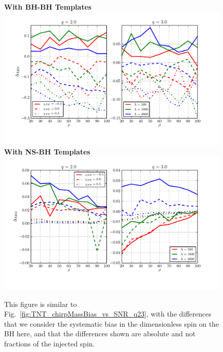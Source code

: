 \documentclass[aps,prd,amsmath,floats,floatfix, twocolumn,
superscriptaddress,nofootinbib,showpacs]{revtex4-1}
\begin{document}
\begin{figure}[h]
\centering    
\textbf{With BH-BH Templates}
\includegraphics[width=2\columnwidth]{plots/TN_BHspinBias_vs_SNR_q23.pdf}\\ 
\textbf{With NS-BH Templates}
\includegraphics[width=2\columnwidth]{plots/TT_BHspinBias_vs_SNR_q23.pdf}%
\caption{This figure is similar to Fig.~\ref{fig:TNT_chirpMassBias_vs_SNR_q23},
with the differences that we consider the systematic bias in the dimensionless
spin on the BH here, and that the differences shown are absolute and not
fractions of the injected spin.}
\label{fig:TNT_BHspinBias_vs_SNR_q23}
\end{figure}
% 
\end{document}
